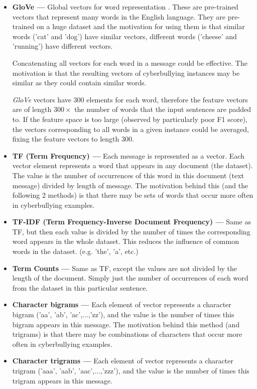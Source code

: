 \documentclass[12pt,a4paper]{article}
\begin{document}
\begin{itemize}
	\item \textbf{GloVe --- } Global vectors for word representation \cite{glove}. These are pre-trained vectors that represent many words in the English language. They are pre-trained on a huge dataset and the motivation for using them is that similar words ('cat' and 'dog') have similar vectors, different words ('cheese' and 'running') have different vectors. 
	
	Concatenating all vectors for each word in a message could be effective. The motivation is that the resulting vectors of cyberbullying instances may be similar as they could contain similar words. 
	
	\textit{GloVe} vectors have 300 elements for each word, therefore the feature vectors are of length $300 \times$ the number of words that the input sentences are padded to. If the feature space is too large (observed by particularly poor F1 score), the vectors corresponding to all words in a given instance could be averaged, fixing the feature vectors to length 300. 
	
	\item \textbf{TF (Term Frequency) --- } Each message is represented as a vector. Each vector element represents a word that appears in any document (the dataset). The value is the number of occurrences of this word in this document (text message) divided by length of message. The motivation behind this (and the following 2 methods) is that there may be sets of words that occur more often in cyberbullying examples.
	
	\item \textbf{TF-IDF (Term Frequency-Inverse Document Frequency) --- } Same as TF, but then each value is divided by the number of times the corresponding word appears in the whole dataset. This reduces the influence of common words in the dataset. (e.g. 'the', 'a', etc.)
	
	\item \textbf{Term Counts --- } Same as TF, except the values are not divided by the length of the document. Simply just the number of occurrences of each word from the dataset in this particular sentence.
	
	\item \textbf{Character bigrams --- } Each element of vector represents a character bigram ('aa', 'ab', 'ac',...,'zz'), and the value is the number of times this bigram appears in this message. The motivation behind this method (and trigrams) is that there may be combinations of characters that occur more often in cyberbullying examples.
	
	\item \textbf{Character trigrams --- } Each element of vector represents a character trigram ('aaa', 'aab', 'aac',...,'zzz'), and the value is the number of times this trigram appears in this message.
\end{itemize}
\end{document}
